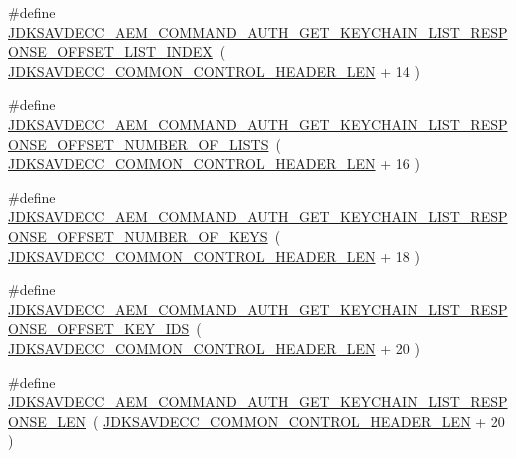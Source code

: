 \begin{DoxyCompactItemize}
\item 
\#define \hyperlink{group__command__auth__get__keychain__list__response_gace9350ce8ee70cdad64a1d1e768b961b}{J\+D\+K\+S\+A\+V\+D\+E\+C\+C\+\_\+\+A\+E\+M\+\_\+\+C\+O\+M\+M\+A\+N\+D\+\_\+\+A\+U\+T\+H\+\_\+\+G\+E\+T\+\_\+\+K\+E\+Y\+C\+H\+A\+I\+N\+\_\+\+L\+I\+S\+T\+\_\+\+R\+E\+S\+P\+O\+N\+S\+E\+\_\+\+O\+F\+F\+S\+E\+T\+\_\+\+L\+I\+S\+T\+\_\+\+I\+N\+D\+EX}~( \hyperlink{group__jdksavdecc__avtp__common__control__header_gaae84052886fb1bb42f3bc5f85b741dff}{J\+D\+K\+S\+A\+V\+D\+E\+C\+C\+\_\+\+C\+O\+M\+M\+O\+N\+\_\+\+C\+O\+N\+T\+R\+O\+L\+\_\+\+H\+E\+A\+D\+E\+R\+\_\+\+L\+EN} + 14 )
\item 
\#define \hyperlink{group__command__auth__get__keychain__list__response_ga77d59797bf2b54d56002b36ffa8258d2}{J\+D\+K\+S\+A\+V\+D\+E\+C\+C\+\_\+\+A\+E\+M\+\_\+\+C\+O\+M\+M\+A\+N\+D\+\_\+\+A\+U\+T\+H\+\_\+\+G\+E\+T\+\_\+\+K\+E\+Y\+C\+H\+A\+I\+N\+\_\+\+L\+I\+S\+T\+\_\+\+R\+E\+S\+P\+O\+N\+S\+E\+\_\+\+O\+F\+F\+S\+E\+T\+\_\+\+N\+U\+M\+B\+E\+R\+\_\+\+O\+F\+\_\+\+L\+I\+S\+TS}~( \hyperlink{group__jdksavdecc__avtp__common__control__header_gaae84052886fb1bb42f3bc5f85b741dff}{J\+D\+K\+S\+A\+V\+D\+E\+C\+C\+\_\+\+C\+O\+M\+M\+O\+N\+\_\+\+C\+O\+N\+T\+R\+O\+L\+\_\+\+H\+E\+A\+D\+E\+R\+\_\+\+L\+EN} + 16 )
\item 
\#define \hyperlink{group__command__auth__get__keychain__list__response_ga653a034aefc99679fb79e512b2cf76b8}{J\+D\+K\+S\+A\+V\+D\+E\+C\+C\+\_\+\+A\+E\+M\+\_\+\+C\+O\+M\+M\+A\+N\+D\+\_\+\+A\+U\+T\+H\+\_\+\+G\+E\+T\+\_\+\+K\+E\+Y\+C\+H\+A\+I\+N\+\_\+\+L\+I\+S\+T\+\_\+\+R\+E\+S\+P\+O\+N\+S\+E\+\_\+\+O\+F\+F\+S\+E\+T\+\_\+\+N\+U\+M\+B\+E\+R\+\_\+\+O\+F\+\_\+\+K\+E\+YS}~( \hyperlink{group__jdksavdecc__avtp__common__control__header_gaae84052886fb1bb42f3bc5f85b741dff}{J\+D\+K\+S\+A\+V\+D\+E\+C\+C\+\_\+\+C\+O\+M\+M\+O\+N\+\_\+\+C\+O\+N\+T\+R\+O\+L\+\_\+\+H\+E\+A\+D\+E\+R\+\_\+\+L\+EN} + 18 )
\item 
\#define \hyperlink{group__command__auth__get__keychain__list__response_ga416d6855776a11ce41b56a41968914cf}{J\+D\+K\+S\+A\+V\+D\+E\+C\+C\+\_\+\+A\+E\+M\+\_\+\+C\+O\+M\+M\+A\+N\+D\+\_\+\+A\+U\+T\+H\+\_\+\+G\+E\+T\+\_\+\+K\+E\+Y\+C\+H\+A\+I\+N\+\_\+\+L\+I\+S\+T\+\_\+\+R\+E\+S\+P\+O\+N\+S\+E\+\_\+\+O\+F\+F\+S\+E\+T\+\_\+\+K\+E\+Y\+\_\+\+I\+DS}~( \hyperlink{group__jdksavdecc__avtp__common__control__header_gaae84052886fb1bb42f3bc5f85b741dff}{J\+D\+K\+S\+A\+V\+D\+E\+C\+C\+\_\+\+C\+O\+M\+M\+O\+N\+\_\+\+C\+O\+N\+T\+R\+O\+L\+\_\+\+H\+E\+A\+D\+E\+R\+\_\+\+L\+EN} + 20 )
\item 
\#define \hyperlink{group__command__auth__get__keychain__list__response_ga884aaa001eecfb7bfea4d495ad8f31a0}{J\+D\+K\+S\+A\+V\+D\+E\+C\+C\+\_\+\+A\+E\+M\+\_\+\+C\+O\+M\+M\+A\+N\+D\+\_\+\+A\+U\+T\+H\+\_\+\+G\+E\+T\+\_\+\+K\+E\+Y\+C\+H\+A\+I\+N\+\_\+\+L\+I\+S\+T\+\_\+\+R\+E\+S\+P\+O\+N\+S\+E\+\_\+\+L\+EN}~( \hyperlink{group__jdksavdecc__avtp__common__control__header_gaae84052886fb1bb42f3bc5f85b741dff}{J\+D\+K\+S\+A\+V\+D\+E\+C\+C\+\_\+\+C\+O\+M\+M\+O\+N\+\_\+\+C\+O\+N\+T\+R\+O\+L\+\_\+\+H\+E\+A\+D\+E\+R\+\_\+\+L\+EN} + 20 )
\end{DoxyCompactItemize}
